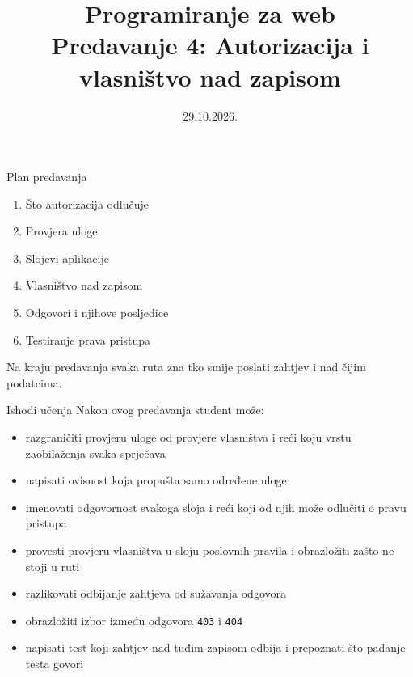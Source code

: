 

\title[Predavanje 4: Autorizacija]{Programiranje za web \\ Predavanje 4: Autorizacija i vlasništvo nad zapisom}
\date{29.10.2026.}



\frame{\titlepage}

\begin{frame}{Plan predavanja}
\begin{enumerate}
  \item Što autorizacija odlučuje
  \item Provjera uloge
  \item Slojevi aplikacije
  \item Vlasništvo nad zapisom
  \item Odgovori i njihove posljedice
  \item Testiranje prava pristupa
\end{enumerate}

\vspace{0.6em}
Na kraju predavanja svaka ruta zna tko smije poslati zahtjev i nad čijim podatcima.
\end{frame}

\begin{frame}{Ishodi učenja}
Nakon ovog predavanja student može:

\begin{itemize}
  \item razgraničiti provjeru uloge od provjere vlasništva i reći koju vrstu zaobilaženja svaka sprječava
  \item napisati ovisnost koja propušta samo određene uloge
  \item imenovati odgovornost svakoga sloja i reći koji od njih može odlučiti o pravu pristupa
  \item provesti provjeru vlasništva u sloju poslovnih pravila i obrazložiti zašto ne stoji u ruti
  \item razlikovati odbijanje zahtjeva od sužavanja odgovora
  \item obrazložiti izbor između odgovora \texttt{403} i \texttt{404}
  \item napisati test koji zahtjev nad tuđim zapisom odbija i prepoznati što padanje testa govori
\end{itemize}
\end{frame}

